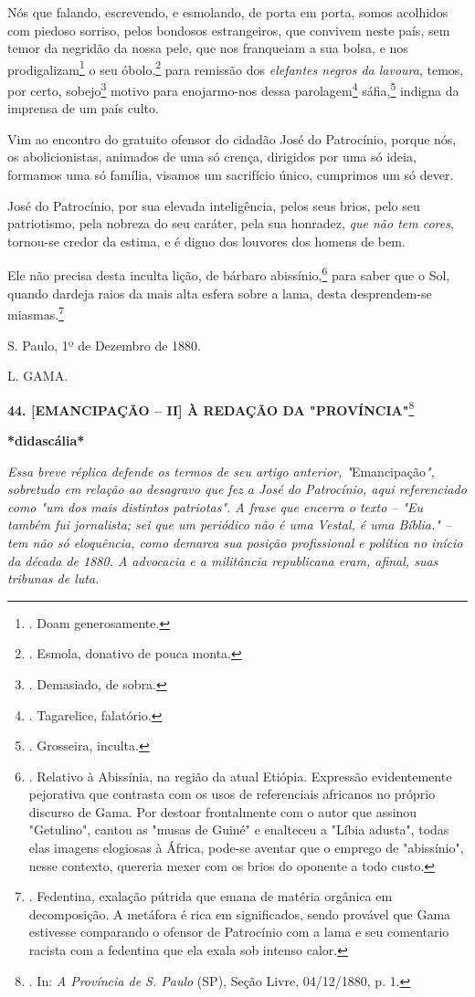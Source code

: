 Nós que falando, escrevendo, e esmolando, de porta em porta, somos
acolhidos com piedoso sorriso, pelos bondosos estrangeiros, que convivem
neste país, sem temor da negridão da nossa pele, que nos franqueiam a
sua bolsa, e nos prodigalizam\footnote{. Doam generosamente.} o seu
óbolo,\footnote{. Esmola, donativo de pouca monta.} para remissão dos
\emph{elefantes negros da lavoura}, temos, por certo, sobejo\footnote{.
  Demasiado, de sobra.} motivo para enojarmo-nos dessa
parolagem\footnote{. Tagarelice, falatório.} sáfia,\footnote{.
  Grosseira, inculta.} indigna da imprensa de um país culto.

Vim ao encontro do gratuito ofensor do cidadão José do Patrocínio,
porque nós, os abolicionistas, animados de uma só crença, dirigidos por
uma só ideia, formamos uma só família, visamos um sacrifício único,
cumprimos um só dever.

José do Patrocínio, por sua elevada inteligência, pelos seus brios, pelo
seu patriotismo, pela nobreza do seu caráter, pela sua honradez,
\emph{que não tem cores}, tornou-se credor da estima, e é digno dos
louvores dos homens de bem.

Ele não precisa desta inculta lição, de bárbaro abissínio,\footnote{.
  Relativo à Abissínia, na região da atual Etiópia. Expressão
  evidentemente pejorativa que contrasta com os usos de referenciais
  africanos no próprio discurso de Gama. Por destoar frontalmente com o
  autor que assinou "Getulino", cantou as "musas de Guiné" e enalteceu a
  "Líbia adusta", todas elas imagens elogiosas à África, pode-se aventar
  que o emprego de "abissínio", nesse contexto, quereria mexer com os
  brios do oponente a todo custo.} para saber que o Sol, quando dardeja
raios da mais alta esfera sobre a lama, desta desprendem-se
miasmas.\footnote{. Fedentina, exalação pútrida que emana de matéria
  orgânica em decomposição. A metáfora é rica em significados, sendo
  provável que Gama estivesse comparando o ofensor de Patrocínio com a
  lama e seu comentario racista com a fedentina que ela exala sob
  intenso calor.}

S. Paulo, 1º de Dezembro de
1880.

L. GAMA.

\textbf{44. {[}EMANCIPAÇÃO -- II{]} À REDAÇÃO DA "PROVÍNCIA"}\footnote{.
  In: \emph{A Província de S. Paulo} (SP), Seção Livre, 04/12/1880, p.
  1.}

\textbf{*didascália*}

\emph{Essa breve réplica defende os termos de seu artigo anterior,
"}Emancipação\emph{", sobretudo em relação ao desagravo que fez a José
do Patrocínio, aqui referenciado como "um dos mais distintos patriotas".
A frase que encerra o texto -- "Eu também fui jornalista; sei que um
periódico não é uma Vestal, é uma Bíblia." -- tem não só eloquência,
como demarca sua posição profissional e política no início da década de
1880. A advocacia e a militância republicana eram, afinal, suas tribunas
de luta.}

